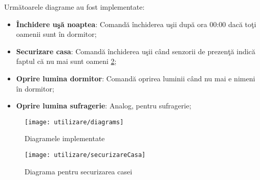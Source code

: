 Următoarele diagrame au fost implementate:
\begin{itemize}
	\item \textbf{Închidere uşă noaptea}: Comandă închiderea uşii după ora 00:00 dacă toţi oamenii sunt în dormitor;
	\item \textbf{Securizare casa}:  Comandă închiderea uşii când senzorii de prezenţă indică faptul că nu mai sunt oameni \ref{fig:securizareCasa};
	\item \textbf{Oprire lumina dormitor}:  Comandă oprirea luminii când nu mai e nimeni în dormitor;
	\item \textbf{Oprire lumina sufragerie}: Analog, pentru sufragerie;
\end{itemize}

\begin{figure}[H]
	\centering
	\texttt{[image: utilizare/diagrams]}
	\captionsetup{justification=centering}
	\caption{Diagramele implementate}
	\label{fig:diagrams}
\end{figure}

\begin{figure}[H]
	\centering
	\texttt{[image: utilizare/securizareCasa]}
	\captionsetup{justification=centering}
	\caption{Diagrama pentru securizarea casei}
	\label{fig:securizareCasa}
\end{figure}